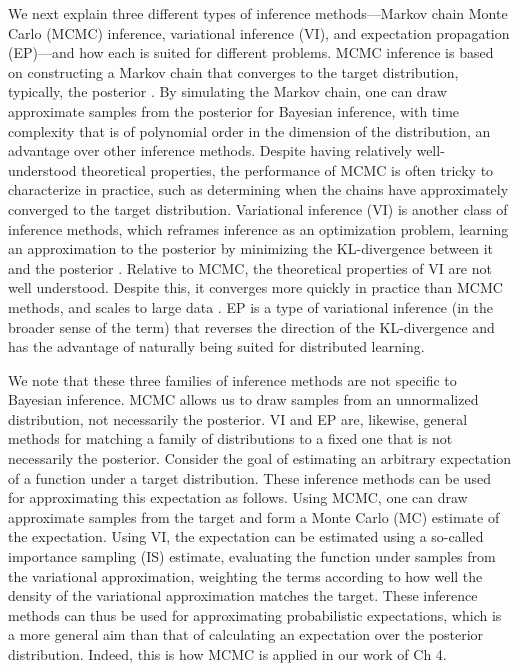 We next explain three different types of inference methods---Markov chain Monte Carlo (MCMC) inference, variational inference (VI), and expectation propagation (EP)---and how each is suited for different problems. MCMC inference is based on constructing a Markov chain that converges to the target distribution, typically, the posterior \citep{andrieu2003introduction}. By simulating the Markov chain, one can draw approximate samples from the posterior for Bayesian inference, with time complexity that is of polynomial order in the dimension of the distribution, an advantage over other inference methods. Despite having relatively well-understood theoretical properties, the performance of MCMC is often tricky to characterize in practice, such as determining when the chains have approximately converged to the target distribution. Variational inference (VI) is another class of inference methods, which reframes inference as an optimization problem, learning an approximation to the posterior by minimizing the KL-divergence between it and the posterior \citep{jordan1999introduction}. Relative to MCMC, the theoretical properties of VI are not well understood. Despite this, it converges more quickly in practice than MCMC methods, and scales to large data \citep{HoffmanEtAl2013}. EP is a type of variational inference (in the broader sense of the term) that reverses the direction of the KL-divergence and has the advantage of naturally being suited for distributed learning. 


We note that these three families of inference methods are not specific to Bayesian inference. MCMC allows us to draw samples from an unnormalized distribution, not necessarily the posterior. VI and EP are, likewise, general methods for matching a family of distributions to a fixed one that is not necessarily the posterior. Consider the goal of estimating an arbitrary expectation of a function under a target distribution. These inference methods can be used for approximating this expectation as follows. Using MCMC, one can draw approximate samples from the target and form a Monte Carlo (MC) estimate of the expectation. Using VI, the expectation can be estimated using a so-called importance sampling (IS) estimate, evaluating the function under samples from the variational approximation, weighting the terms according to how well the density of the variational approximation matches the target. These inference methods can thus be used for approximating probabilistic expectations, which is a more general aim than that of calculating an expectation over the posterior distribution. Indeed, this is how MCMC is applied in our work of Ch 4.

